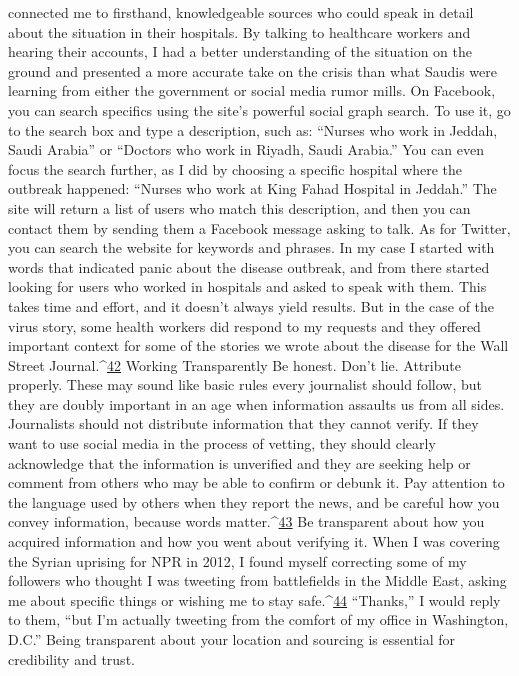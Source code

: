 connected me to firsthand, knowledgeable sources who could speak in detail about the
situation in their hospitals. By talking to healthcare workers and hearing their accounts, I
had a better understanding of the situation on the ground and presented a more accurate
take on the crisis than what Saudis were learning from either the government or social
media rumor mills.
On Facebook, you can search specifics using the site’s powerful social graph search. To
use it, go to the search box and type a description, such as: ``Nurses who work in Jeddah,
Saudi Arabia'' or ``Doctors who work in Riyadh, Saudi Arabia.'' You can even focus the
search further, as I did by choosing a specific hospital where the outbreak happened:
``Nurses who work at King Fahad Hospital in Jeddah.'' The site will return a list of users
who match this description, and then you can contact them by sending them a Facebook
message asking to talk. As for Twitter, you can search the website for keywords and
phrases. In my case I started with words that indicated panic about the disease outbreak,
and from there started looking for users who worked in hospitals and asked to speak with
them.
This takes time and effort, and it doesn’t always yield results. But in the case of the virus
story, some health workers did respond to my requests and they offered important context
for some of the stories we wrote about the disease for the Wall Street Journal.^{\href{#endnotes}{42}}
Working Transparently
Be honest. Don’t lie. Attribute properly. These may sound like basic rules every
journalist should follow, but they are doubly important in an age when information
assaults us from all sides.
Journalists should not distribute information that they cannot verify. If they want to use
social media in the process of vetting, they should clearly acknowledge that the
information is unverified and they are seeking help or comment from others who may be
able to confirm or debunk it. Pay attention to the language used by others when they
report the news, and be careful how you convey information, because words matter.^{\href{#endnotes}{43}} Be
transparent about how you acquired information and how you went about verifying it.
When I was covering the Syrian uprising for NPR in 2012, I found myself correcting
some of my followers who thought I was tweeting from battlefields in the Middle East,
asking me about specific things or wishing me to stay safe.^{\href{#endnotes}{44}} ``Thanks,'' I would reply to
them, ``but I’m actually tweeting from the comfort of my office in Washington, D.C.''
Being transparent about your location and sourcing is essential for credibility and trust.
